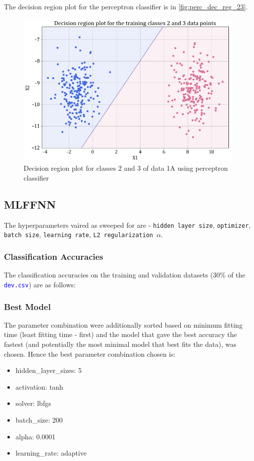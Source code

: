 \documentclass[11pt,a4paper]{article}
\newcommand{\noi}{\noindent}
\def\tt#1{\texttt{#1}}
\def\colortt#1{\textcolor{blue}{\texttt{#1}}}
\begin{document}
\noi
The decision region plot for the perceptron classifier is in \autoref{fig:perc_dec_reg_23}.
\begin{figure}[H]
    \centering
    \includegraphics[scale = 0.45]{images/1A_perceptron_training_classes_2_and_3_dec_reg.png}
    \caption{Decision region plot for classes 2 and 3 of data 1A using perceptron classifier}
    \label{fig:perc_dec_reg_23}
\end{figure}


\subsection{MLFFNN}
The hyperparameters vaired as sweeped for are - \tt{hidden layer size}, \tt{optimizer}, \tt{batch size}, \tt{learning rate}, \tt{L2 regularization $\alpha$}.

\subsubsection{Classification Accuracies}
The classification accuracies on the training and validation datasets (30\% of the \colortt{dev.csv}) are as follows:


\subsubsection{Best Model}
The parameter combination were additionally sorted based on minimum fitting time (least fitting time - first) and the model that gave the best accuracy the fastest (and potentially the most minimal model that best fits the data), was chosen. Hence the best parameter combination chosen is:
\begin{itemize}
    \itemsep0em
    \item hidden\_layer\_sizes: 5
    \item activation: tanh
    \item solver: lbfgs
    \item batch\_size: 200
    \item alpha: 0.0001
    \item learning\_rate: adaptive
\end{itemize}
\end{document}
